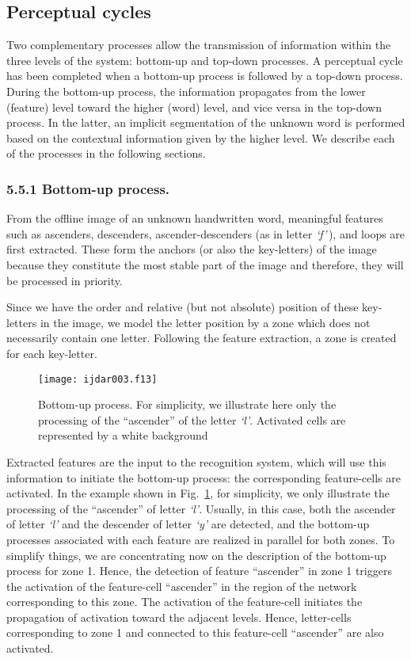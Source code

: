 \documentclass[ijdar]{svjour}
\begin{document}
\subsection{Perceptual cycles}
\label{SECPERCEPT}

Two complementary processes allow the transmission of information within the three levels of the system: bottom-up and top-down processes.
A perceptual cycle has been completed when a bottom-up process is followed by a top-down process.
During the bottom-up process, the information propagates from the lower (feature) level toward the higher (word) level, and vice versa in the top-down process.
In the latter, an implicit segmentation of the unknown word is performed based on the contextual information given by the higher level.
We describe each of the processes in the following sections.


\subsubsection{5.5.1 Bottom-up process.}
\label{SECPASC}


From the offline image of an unknown handwritten word, meaningful features such as ascenders, descenders, ascen\-der-descenders (as in letter {\it
`f'}\,), and loops are first extracted.
These form the anchors (or also the key-letters) of the image because they constitute the most stable part of the image and therefore, they will be processed in priority.

Since we have the order and relative (but not absolute) position of these key-letters in the image, we model the letter position by a zone which does not necessarily contain one letter.
Following the feature extraction, a zone is created for each key-letter.

\begin{figure}%
\texttt{[image: ijdar003.f13]}%
\caption{Bottom-up process. For simplicity, we illustrate here only the
processing of the ``ascender'' of the letter {\it `l'}. Activated cells
are represented by a white background}
\label{FIGASC}
\end{figure}

Extracted features are the input to the recognition system, which will use this information to initiate the bottom-up process: the corresponding feature-cells are activated.
In the example shown in Fig.~\ref{FIGASC}, for simplicity, we only illustrate the processing of the ``ascender'' of letter {\it `l'}.
Usually, in this case, both the ascender of letter {\it `l'} and the descender of letter {\it `y'} are detected, and the bottom-up processes associated with each feature are realized in parallel for both zones.
To simplify things, we are concentrating now on the description of the bottom-up process for zone 1.
Hence, the detection of feature ``ascender'' in zone 1 triggers the activation of the feature-cell ``ascender'' in the region of the network corresponding to this zone.
The activation of the feature-cell initiates the propagation of activation toward the adjacent levels.
Hence, letter-cells corresponding to zone 1 and connected to this feature-cell ``ascender'' are also activated.
\end{document}
